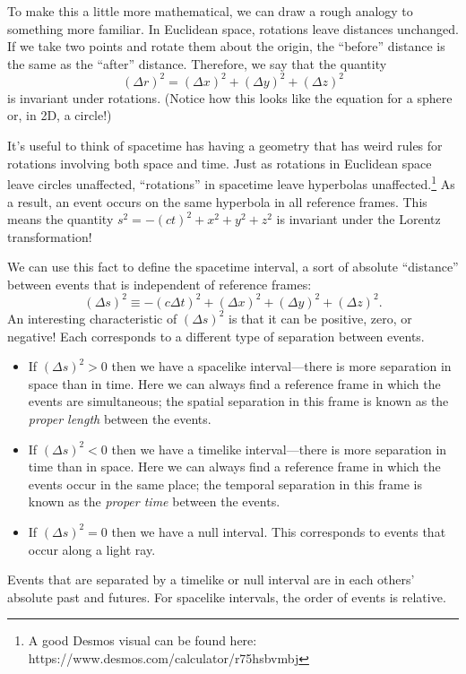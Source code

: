 \documentclass[../p023main.tex]{subfiles}
\begin{document}
To make this a little more mathematical, we can draw a rough analogy to something more familiar.
In Euclidean space, rotations leave distances unchanged.
If we take two points and rotate them about the origin, the ``before'' distance is the same as the ``after'' distance.
Therefore, we say that the quantity
\[ (\Delta r)^2 = (\Delta x)^2 + (\Delta y)^2 + (\Delta z)^2 \]
is invariant under rotations.
(Notice how this looks like the equation for a sphere or, in 2D, a circle!)

It's useful to think of spacetime has having a geometry that has weird rules for rotations involving both space and time.
Just as rotations in Euclidean space leave circles unaffected, ``rotations'' in spacetime leave hyperbolas unaffected.\footnote{A good Desmos visual can be found here: https://www.desmos.com/calculator/r75hsbvmbj}
As a result, an event occurs on the same hyperbola in all reference frames.
This means the quantity $s^2 = -(ct)^2 + x^2 + y^2 + z^2$ is invariant under the Lorentz transformation!

We can use this fact to define the spacetime interval, a sort of absolute ``distance'' between events that is independent of reference frames:
\[ (\Delta s)^2 \equiv -(c \Delta t)^2 + (\Delta x)^2 + (\Delta y)^2 + (\Delta z)^2. \]
An interesting characteristic of $(\Delta s)^2$ is that it can be positive, zero, or negative!
Each corresponds to a different type of separation between events.
\begin{itemize}
    \item If $(\Delta s)^2 > 0$ then we have a spacelike interval---there is more separation in space than in time.
    Here we can always find a reference frame in which the events are simultaneous; the spatial separation in this frame is known as the \textit{proper length} between the events.
    \item If $(\Delta s)^2 < 0$ then we have a timelike interval---there is more separation in time than in space.
    Here we can always find a reference frame in which the events occur in the same place; the temporal separation in this frame is known as the \textit{proper time} between the events.
    \item If $(\Delta s)^2 = 0$ then we have a null interval.
    This corresponds to events that occur along a light ray.
\end{itemize}
Events that are separated by a timelike or null interval are in each others' absolute past and futures.
For spacelike intervals, the order of events is relative.
\end{document}

